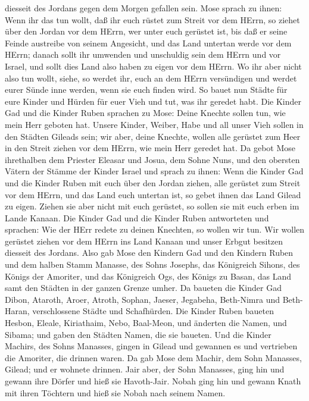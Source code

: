 diesseit des Jordans gegen dem Morgen gefallen sein.  Mose
sprach zu ihnen: Wenn ihr das tun wollt, daß ihr euch rüstet zum Streit
vor dem HErrn,  so ziehet über den Jordan vor dem HErrn,
wer unter euch gerüstet ist, bis daß er seine Feinde austreibe von
seinem Angesicht,  und das Land untertan werde vor dem
HErrn; danach sollt ihr umwenden und unschuldig sein dem HErrn und vor
Israel, und sollt dies Land also haben zu eigen vor dem HErrn.
 Wo ihr aber nicht also tun wollt, siehe, so werdet ihr,
euch an dem HErrn versündigen und werdet eurer Sünde inne werden, wenn
sie euch finden wird.  So bauet nun Städte für eure Kinder
und Hürden für euer Vieh und tut, was ihr geredet habt. 
Die Kinder Gad und die Kinder Ruben sprachen zu Mose: Deine Knechte
sollen tun, wie mein Herr geboten hat.  Unsere Kinder,
Weiber, Habe und all unser Vieh sollen in den Städten Gileads sein;
 wir aber, deine Knechte, wollen alle gerüstet zum Heer in
den Streit ziehen vor dem HErrn, wie mein Herr geredet hat.
 Da gebot Mose ihrethalben dem Priester Eleasar und Josua,
dem Sohne Nuns, und den obersten Vätern der Stämme der Kinder Israel
 und sprach zu ihnen: Wenn die Kinder Gad und die Kinder
Ruben mit euch über den Jordan ziehen, alle gerüstet zum Streit vor dem
HErrn, und das Land euch untertan ist, so gebet ihnen das Land Gilead zu
eigen.  Ziehen sie aber nicht mit euch gerüstet, so sollen
sie mit euch erben im Lande Kanaan.  Die Kinder Gad und die
Kinder Ruben antworteten und sprachen: Wie der HErr redete zu deinen
Knechten, so wollen wir tun.  Wir wollen gerüstet ziehen
vor dem HErrn ins Land Kanaan und unser Erbgut besitzen diesseit des
Jordans.  Also gab Mose den Kindern Gad und den Kindern
Ruben und dem halben Stamm Manasse, des Sohns Josephs, das Königreich
Sihons, des Königs der Amoriter, und das Königreich Ogs, des Königs zu
Basan, das Land samt den Städten in der ganzen Grenze umher.
 Da baueten die Kinder Gad Dibon, Ataroth, Aroer,
 Atroth, Sophan, Jaeser, Jegabeha,  Beth-Nimra
und Beth-Haran, verschlossene Städte und Schafhürden.  Die
Kinder Ruben baueten Hesbon, Eleale, Kiriathaim,  Nebo,
Baal-Meon, und änderten die Namen, und Sibama; und gaben den Städten
Namen, die sie baueten.  Und die Kinder Machirs, des Sohns
Manasses, gingen in Gilead und gewannen es und vertrieben die Amoriter,
die drinnen waren.  Da gab Mose dem Machir, dem Sohn
Manasses, Gilead; und er wohnete drinnen.  Jair aber, der
Sohn Manasses, ging hin und gewann ihre Dörfer und hieß sie Havoth-Jair.
 Nobah ging hin und gewann Knath mit ihren Töchtern und
hieß sie Nobah nach seinem Namen.

